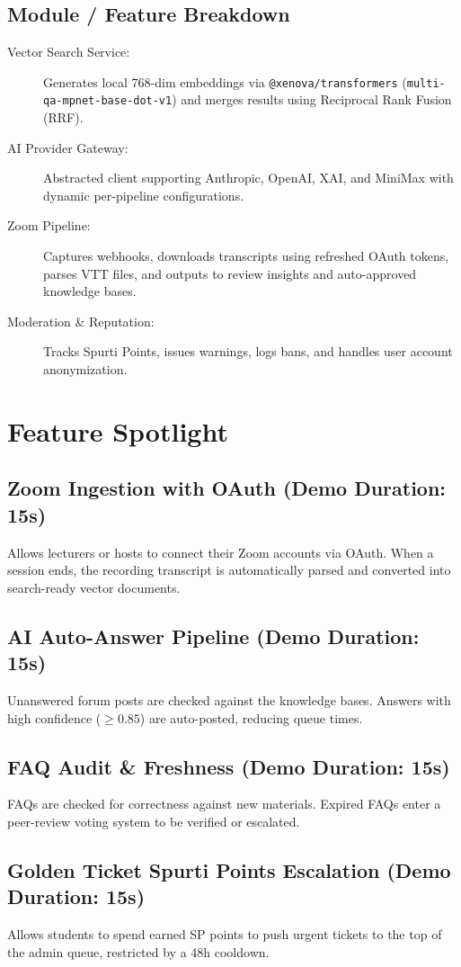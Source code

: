 \documentclass[11pt,a4paper]{article}
\begin{document}
\subsection{Module / Feature Breakdown}
\begin{description}
    \item[Vector Search Service:] Generates local 768-dim embeddings via \texttt{@xenova/transformers} (\texttt{multi-qa-mpnet-base-dot-v1}) and merges results using Reciprocal Rank Fusion (RRF).
    \item[AI Provider Gateway:] Abstracted client supporting Anthropic, OpenAI, XAI, and MiniMax with dynamic per-pipeline configurations.
    \item[Zoom Pipeline:] Captures webhooks, downloads transcripts using refreshed OAuth tokens, parses VTT files, and outputs to review insights and auto-approved knowledge bases.
    \item[Moderation \& Reputation:] Tracks Spurti Points, issues warnings, logs bans, and handles user account anonymization.
\end{description}

\section{Feature Spotlight}
\subsection{Zoom Ingestion with OAuth (Demo Duration: 15s)}
Allows lecturers or hosts to connect their Zoom accounts via OAuth. When a session ends, the recording transcript is automatically parsed and converted into search-ready vector documents.
\subsection{AI Auto-Answer Pipeline (Demo Duration: 15s)}
Unanswered forum posts are checked against the knowledge bases. Answers with high confidence ($\ge 0.85$) are auto-posted, reducing queue times.
\subsection{FAQ Audit \& Freshness (Demo Duration: 15s)}
FAQs are checked for correctness against new materials. Expired FAQs enter a peer-review voting system to be verified or escalated.
\subsection{Golden Ticket Spurti Points Escalation (Demo Duration: 15s)}
Allows students to spend earned SP points to push urgent tickets to the top of the admin queue, restricted by a 48h cooldown.
\end{document}
